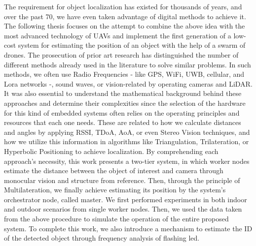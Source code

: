 \begin{extraAbstract}
	\addchaptertocentry{\abstractname} %
	
	The requirement for object localization has existed for thousands of years, and over the past 70, we have even taken advantage of digital methods to achieve it.
	The following thesis focuses on the attempt to combine the above idea with the most advanced technology of UAVs and implement the first generation of a low-cost system for estimating the position of an object with the help of a swarm of drones.
	The prosecution of prior art research has distinguished the number of different methods already used in the literature to solve similar problems.
	In such methods, we often use Radio Frequencies - like GPS, WiFi, UWB, cellular, and Lora networks -, sound waves, or vision-related by operating cameras and LiDAR.
	It was also essential to understand the mathematical background behind these approaches and determine their complexities since the selection of the hardware for this kind of embedded systems often relies on the operating principles and resources that each one needs.
	 These are related to how we calculate distances and angles by applying RSSI, TDoA, AoA, or even Stereo Vision techniques, and how we utilize this information in algorithms like Triangulation, Trilateration, or Hyperbolic Positioning to achieve localization.
	By comprehending each approach’s necessity, this work presents a two-tier system, in which worker nodes estimate the distance between the object of interest and camera through monocular vision and structure from reference. Then, through the principle of Multilateration, we finally achieve estimating its position by the system’s orchestrator node, called master.
	We first performed experiments in both indoor and outdoor scenarios from single worker nodes. Then, we used the data taken from the above procedure to simulate the operation of the entire proposed system. To complete this work, we also introduce a mechanism to estimate the ID of the detected object through frequency analysis of flashing led.
\end{extraAbstract}
